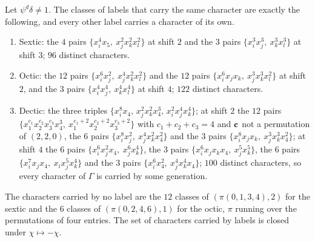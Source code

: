 \begin{proposition}\label{prop:wchars}
Let $\psi^d\delta\ne1$. The classes of labels that carry the same character
are exactly the following, and every other label carries a character of its
own.
\begin{enumerate}[label=\textup{(\alph*)},leftmargin=*,itemsep=1pt]
\item Sextic: the $4$ pairs $\{x_i^4x_5,\ x_j^2x_k^2x_l^2\}$ at shift
$2$ and the $3$ pairs $\{x_i^3x_j^3,\ x_k^3x_l^3\}$ at shift $3$; $96$
distinct characters.
\item Octic: the $12$ pairs $\{x_i^6x_j^2,\ x_j^4x_k^2x_l^2\}$ and the $12$
pairs $\{x_i^6x_jx_k,\ x_j^3x_k^3x_l^2\}$ at shift $2$, and the $3$ pairs
$\{x_i^4x_j^4,\ x_k^4x_l^4\}$ at shift $4$; $122$ distinct characters.
\item Dectic: the three triples $\{x_i^8x_4,\,x_j^2x_k^2x_4^3,\,
x_i^2x_j^4x_k^4\}$; at shift $2$ the $12$ pairs $\{x_1^{c_1}x_2^{c_2}
x_3^{c_3}x_4^3,\allowbreak\ x_1^{c_1+2}x_2^{c_2+2}x_3^{c_3+2}\}$ with $c_1+c_2+c_3=4$
and $\mathbf{c}$ not a permutation of $(2,2,0)$, the $6$ pairs
$\{x_i^8x_j^2,\allowbreak\ x_j^4x_k^2x_4^2\}$ and the $3$ pairs
$\{x_i^8x_jx_k,\allowbreak\ x_j^3x_k^3x_4^2\}$; at shift $4$ the $6$ pairs
$\{x_i^6x_j^2x_4,\allowbreak\ x_j^6x_k^4\}$, the $3$ pairs
$\{x_i^6x_jx_kx_4,\allowbreak\ x_j^5x_k^5\}$, the $6$ pairs
$\{x_i^7x_jx_4,\allowbreak\ x_ix_j^5x_k^4\}$ and the $3$ pairs
$\{x_i^6x_4^2,\allowbreak\ x_j^4x_k^4x_4\}$; $100$ distinct characters, so every
character of $\Gamma$ is carried by some generation.
\end{enumerate}
The characters carried by no label are the $12$ classes of
$(\pi(0,1,3,4),2)$ for the sextic and the $6$ classes of
$(\pi(0,2,4,6),1)$ for the octic, $\pi$ running over the permutations of
four entries. The set of characters carried by labels is closed under
$\chi\mapsto-\chi$.
\end{proposition}


